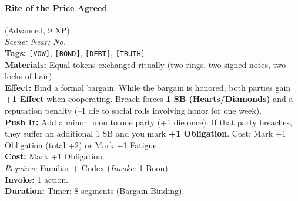 \paragraph{Rite of the Price Agreed} (Advanced, 9 XP) \hfill \\
\emph{Scene; Near; No.} \\
\textbf{Tags:} \texttt{[VOW]}, \texttt{[BOND]}, \texttt{[DEBT]}, \texttt{[TRUTH]} \\
\textbf{Materials:} Equal tokens exchanged ritually (two rings, two signed notes, two locks of hair). \\
\textbf{Effect:} Bind a formal bargain. While the bargain is honored, both parties gain \textbf{+1 Effect} when cooperating. Breach forces \textbf{1 SB (Hearts/Diamonds)} and a reputation penalty (--1 die to social rolls involving honor for one week). \\
\textbf{Push It:} Add a minor boon to one party (+1 die once). If that party breaches, they suffer an additional 1 SB and you mark \textbf{+1 Obligation}. Cost: Mark +1 Obligation (total +2) or Mark +1 Fatigue. \\
\textbf{Cost:} Mark +1 Obligation. \\
\textit{Requires:} Familiar + Codex (\textit{Invoke:} 1 Boon). \\
\textbf{Invoke:} 1 action. \\
\textbf{Duration:} Timer: 8 segments (Bargain Binding).

